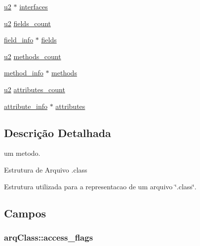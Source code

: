 \begin{DoxyCompactItemize}
\item 
\hyperlink{estruturas_8h_a5f223212eef04d10a4550ded680cb1cf}{u2} $\ast$ \hyperlink{structarq_class_ae20e5a978fd46334f0253968c13bf8ac}{interfaces}
\item 
\hyperlink{estruturas_8h_a5f223212eef04d10a4550ded680cb1cf}{u2} \hyperlink{structarq_class_ae453fb7f35aaaaf1beed2bcb0457ddb2}{fields\+\_\+count}
\item 
\hyperlink{estruturas_8h_a53c0da222997bf70321f1aebc84d8e02}{field\+\_\+info} $\ast$ \hyperlink{structarq_class_af9ed878ae2a6fe25020d83ce00f4407d}{fields}
\item 
\hyperlink{estruturas_8h_a5f223212eef04d10a4550ded680cb1cf}{u2} \hyperlink{structarq_class_a0cdd803ff7b2a6a229c048bb51f1febc}{methods\+\_\+count}
\item 
\hyperlink{estruturas_8h_a02c1a928a94e9fab2c72044003c7bce6}{method\+\_\+info} $\ast$ \hyperlink{structarq_class_a849a70430b6245a2cc8b43a2516c5f00}{methods}
\item 
\hyperlink{estruturas_8h_a5f223212eef04d10a4550ded680cb1cf}{u2} \hyperlink{structarq_class_a4510e8903370aa3575adaa708e4bfed8}{attributes\+\_\+count}
\item 
\hyperlink{estruturas_8h_a4c2796d61bb99bf730b1807fc838c847}{attribute\+\_\+info} $\ast$ \hyperlink{structarq_class_a401819a5062a82788e07df8ebeb4f78c}{attributes}
\end{DoxyCompactItemize}


\subsection{Descrição Detalhada}
um metodo. 

Estrutura de Arquivo .class

Estrutura utilizada para a representacao de um arquivo \char`\"{}.\+class\char`\"{}. 

\subsection{Campos}
\subsubsection[{\texorpdfstring{access\+\_\+flags}{access_flags}}]{ arq\+Class\+::access\+\_\+flags}\hypertarget{structarq_class_a2d74614ed3f671871c0385e5233a8250}{}\label{structarq_class_a2d74614ed3f671871c0385e5233a8250}
